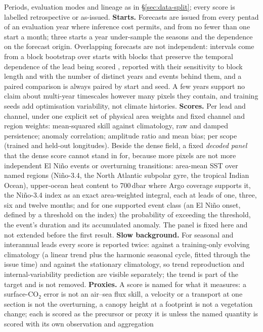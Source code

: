 \documentclass[10pt]{article}
\begin{document}
Periods, evaluation modes and lineage as in \S\ref{sec:data-split}; every
score is labelled retrospective or as-issued. \textbf{Starts.} Forecasts are
issued from every pentad of an evaluation year where inference cost permits,
and from no fewer than one start a month; three starts a year under-sample
the seasons and the dependence on the forecast origin. Overlapping forecasts
are not independent: intervals come from a block bootstrap over starts with
blocks that preserve the temporal dependence of the lead being scored
\cite{goddard}, reported with their sensitivity to block length and with the
number of distinct years and events behind them, and a paired comparison is
always paired by start and seed. A few years support no claim about
multi-year timescales however many pixels they contain, and training seeds
add optimisation variability, not climate histories. \textbf{Scores.} Per
lead and channel, under one explicit set of physical area weights and fixed
channel and region weights: mean-squared skill against climatology, raw and
damped persistence; anomaly correlation; amplitude ratio and mean bias;
per scope (trained and held-out longitudes). Beside the dense field, a fixed
\emph{decoded panel} that the dense score cannot stand in for, because more
pixels are not more independent El Ni\~no events or overturning transitions:
area-mean SST over named regions (Ni\~no-3.4, the North Atlantic subpolar
gyre, the tropical Indian Ocean), upper-ocean heat content to 700\,dbar
where Argo coverage supports it, the Ni\~no-3.4 index as an exact
area-weighted integral, each at leads of one, three, six and twelve months;
and for one supported event class (an El Ni\~no onset, defined by a
threshold on the index) the probability of exceeding the threshold, the
event's duration and its accumulated anomaly. The panel is fixed here and
not extended before the first result. \textbf{Slow background.} For
seasonal and interannual leads every score is reported twice: against a
training-only evolving climatology (a linear trend plus the harmonic
seasonal cycle, fitted through the issue time) and against the stationary
climatology, so trend reproduction and internal-variability prediction are
visible separately; the trend is part of the target and is not removed.
\textbf{Proxies.} A score is named for what it measures: a surface-CO$_2$
error is not an air--sea flux skill, a velocity or a transport at one
section is not the overturning, a canopy height at a footprint is not a
vegetation change; each is scored as the precursor or proxy it is unless the
named quantity is scored with its own observation and aggregation
\end{document}
